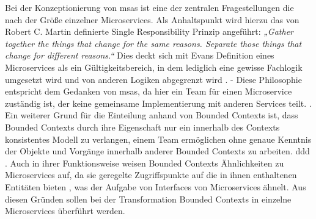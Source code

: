 \documentclass[
	oneside,  %
	ngerman, 
	final, 
	11pt, 
	a4paper, 
	1.1headlines, 
	headinclude=false, 
	footinclude=false, 
	mpinclude=false, 
	pagesize, 
	onecolumn, 
	titlepage, 
	parskip=half, 
	headsepline, 
	chapterprefix=false, 
	version=first, 
	listof=totoc, 
	bibliography=totoc, 
	toc=graduated, 
	fleqn
]{scrbook}
\begin{document}
Bei der Konzeptionierung von \ac{msa}s ist eine der zentralen Fragestellungen die nach der Größe einzelner Microservices. Als Anhaltspunkt wird hierzu das von Robert C. Martin definierte Single Responsibility Prinzip angeführt: \cite{BuildingMicroServices} \textit{„Gather together the things that change for the same reasons. Separate those things that change for different reasons.“} \cite{Martin2003} Dies deckt sich mit Evans Definition eines Microservices als ein  Gültigkeitsbereich, in dem lediglich eine gewisse Fachlogik umgesetzt wird und von anderen Logiken abgegrenzt wird \cite{DDDEvans}. 
- Diese Philosophie entspricht
dem Gedanken von \ac{msa}s, da hier ein Team für einen Microservice zuständig ist, der
keine gemeinsame Implementierung mit anderen Services teilt. \cite{MicroServicesVSSOA}. Ein weiterer Grund für die Einteilung anhand von Bounded Contexts ist, dass Bounded
Contexts durch ihre Eigenschaft nur ein innerhalb des Contexts konsistentes Modell zu
verlangen, einem Team ermöglichen ohne genaue Kenntnis der Objekte und Vorgänge
innerhalb anderer Bounded Contexts zu arbeiten. \ac{ddd} \cite{DDDEvans}.
 Auch in ihrer Funktionsweise weisen Bounded Contexts Ähnlichkeiten zu Microservices auf, da sie geregelte Zugriffspunkte auf die in ihnen enthaltenen Entitäten bieten \cite{DDDEvans}, was der Aufgabe von Interfaces von Microservices ähnelt.
 Aus diesen Gründen sollen bei der Transformation Bounded Contexts in einzelne Microservices überführt werden.
\end{document}

